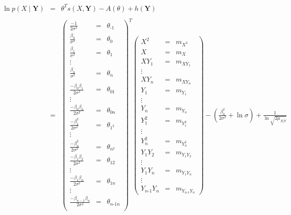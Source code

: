 \documentclass[11pt, oneside]{article}   	%
\numberwithin{figure}{section}
\numberwithin{equation}{section}
\numberwithin{table}{section}
\theoremstyle{definition}
\begin{document}
\begin{appendices}
\begin{itemize}
\begin{eqnarray*}
\ln p(X \mid \mathbf{Y}) &=& \theta^T s(X,\mathbf{Y}) - A(\theta) + h(\mathbf{Y})\\\\
&=&
\begin{pmatrix}
\frac{-1}{2\sigma^2} &=& \theta_{\mbox{-}1} \\
\frac{\beta_0}{\sigma^2} &=& \theta_0 \\
\frac{\beta_1}{\sigma^2} &=& \theta_1 \\
\vdots\\
\frac{\beta_n}{\sigma^2} &=& \theta_n \\\\
\frac{-\beta_0\beta_1}{2\sigma^2} &=&\theta_{01} \\
\vdots\\
\frac{-\beta_0\beta_n}{2\sigma^2} &=& \theta_{0n} \\
\frac{-\beta_1^2}{2\sigma^2} &=& \theta_{1^2} \\
\vdots \\
\frac{-\beta_n^2}{2\sigma^2} &=& \theta_{n^2} \\
\frac{-\beta_1\beta_2}{2\sigma^2} &=& \theta_{12} \\
\vdots\\
\frac{-\beta_1\beta_n}{2\sigma^2} &=& \theta_{1n} \\
\vdots\\
\frac{-\beta_{n-1}\beta_n}{2\sigma^2} &=&\theta_{n\mbox{-}1n} \\
\end{pmatrix}^T
\begin{pmatrix}
X^2   &=& m_{X^2}\\
X     &=& m_{X}\\
XY_1  &=& m_{XY_1}\\
\vdots\\
XY_n  &=& m_{XY_n}\\
Y_1   &=& m_{Y_1}\\
\vdots\\
Y_n   &=& m_{Y_n}\\
Y_1^2 &=& m_{Y_1^2}\\
\vdots\\
Y_n^2 &=& m_{Y_n^2}\\
Y_1Y_2&=& m_{Y_1Y_2}\\
\vdots\\
Y_1Y_n &=& m_{Y_1Y_n}\\
\vdots\\
Y_{n\mbox{-}1}Y_n &=& m_{Y_{n\mbox{-}1}Y_{n}}
\end{pmatrix}
- \left( \frac{\beta_0^2}{2\sigma^2} + \ln{\sigma}\right) + \frac{1}{\ln{\sqrt{2\mu_{X|Y}}}}
\end{eqnarray*}


\end{itemize}
\end{appendices}
\end{document}
